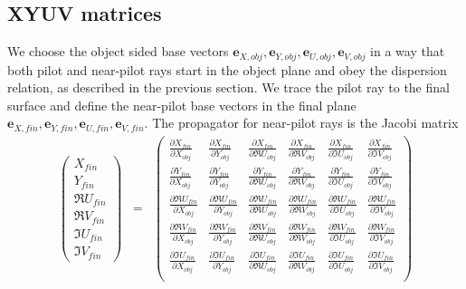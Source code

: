 \documentclass[12pt,a4paper,twoside,openright,BCOR10mm,headsepline,titlepage,abstracton,chapterprefix,final]{scrreprt}
\newcommand\Vector[1]{{\mathbf{#1}}}
\begin{document}
\subsection{XYUV matrices}
We choose the object sided base vectors $\Vector{e}_{X,obj}, \Vector{e}_{Y,obj}, \Vector{e}_{U,obj}, \Vector{e}_{V,obj}$ 
in a way that both pilot and near-pilot rays start in the object plane and obey the dispersion relation, 
as described in the previous section.
We trace the pilot ray to the final surface 
and define the near-pilot base vectors in the final plane $\Vector{e}_{X,fin}, \Vector{e}_{Y,fin}, \Vector{e}_{U,fin}, \Vector{e}_{V,fin}$.
The propagator for near-pilot rays is the Jacobi matrix
\begin{eqnarray}
 \begin{pmatrix}
  X_{fin} \\[2ex] Y_{fin} \\[2ex] \Re U_{fin}\\[2ex] \Re V_{fin} \\[2ex] \Im U_{fin} \\[2ex] \Im V_{fin} 
 \end{pmatrix}
 &=&
 \begin{pmatrix}
  \frac{\partial X_{fin}}{\partial X_{obj}} & \frac{\partial X_{fin}}{\partial Y_{obj}} & \frac{\partial X_{fin}}{\partial \Re U_{obj}} & \frac{\partial X_{fin}}{\partial \Re V_{obj}} & \frac{\partial X_{fin}}{\partial \Im U_{obj}} & \frac{\partial X_{fin}}{\partial \Im V_{obj}} \\[2ex]
  \frac{\partial Y_{fin}}{\partial X_{obj}} & \frac{\partial Y_{fin}}{\partial Y_{obj}} & \frac{\partial Y_{fin}}{\partial \Re U_{obj}} & \frac{\partial Y_{fin}}{\partial \Re V_{obj}} & \frac{\partial Y_{fin}}{\partial \Im U_{obj}} & \frac{\partial Y_{fin}}{\partial \Im V_{obj}} \\[2ex]
  \frac{\partial \Re U_{fin}}{\partial X_{obj}} & \frac{\partial \Re U_{fin}}{\partial Y_{obj}} & \frac{\partial \Re U_{fin}}{\partial \Re U_{obj}} & \frac{\partial \Re U_{fin}}{\partial \Re V_{obj}} & \frac{\partial \Re U_{fin}}{\partial \Im U_{obj}} & \frac{\partial \Re U_{fin}}{\partial \Im V_{obj}} \\[2ex]
  \frac{\partial \Re V_{fin}}{\partial X_{obj}} & \frac{\partial \Re V_{fin}}{\partial Y_{obj}} & \frac{\partial \Re V_{fin}}{\partial \Re U_{obj}} & \frac{\partial \Re V_{fin}}{\partial \Re V_{obj}} & \frac{\partial \Re V_{fin}}{\partial \Im U_{obj}} & \frac{\partial \Re V_{fin}}{\partial \Im V_{obj}} \\[2ex]
  \frac{\partial \Im U_{fin}}{\partial X_{obj}} & \frac{\partial \Im U_{fin}}{\partial Y_{obj}} & \frac{\partial \Im U_{fin}}{\partial \Re U_{obj}} & \frac{\partial \Im U_{fin}}{\partial \Re V_{obj}} & \frac{\partial \Im U_{fin}}{\partial \Im U_{obj}} & \frac{\partial \Im U_{fin}}{\partial \Im V_{obj}} \\[2ex]

\end{pmatrix}
\end{eqnarray}
\end{document}
